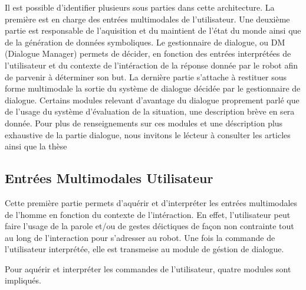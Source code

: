 \documentclass[a4paper,11pt,twoside]{StyleThese}
\begin{document}
Il est possible d'identifier plusieurs sous parties dans cette architecture.
La première est en charge des entrées multimodales de l'utilisateur. Une deuxième partie est responsable de l'aquisition et du maintient de l'état du monde ainsi que de la génération de données symboliques. Le gestionnaire de dialogue, ou DM (Dialogue Manager) permets de décider, en fonction des entrées interprétées de l'utilisateur et du contexte de l'intéraction de la réponse donnée par le robot afin de parvenir à déterminer son but.
La dernière partie s'attache à restituer sous forme multimodale la sortie du système de dialogue décidée par le gestionnaire de dialogue.
Certains modules relevant d'avantage du dialogue proprement parlé que de l'usage du système d'évaluation de la situation, une description brève en sera donnée. Pour plus de renseignements sur ces modules et une déscription plus exhaustive de la partie dialogue, nous invitons le lécteur à consulter les articles \cite{} ainsi que la thèse 



\subsection{Entrées Multimodales Utilisateur} 
Cette première partie permets d'aquérir et d'interpréter les entrées multimodales de l'homme en fonction du contexte de l'intéraction. En effet, l’utilisateur peut faire l’usage de la parole et/ou de
gestes déictiques de façon non contrainte tout au long de l’interaction pour s’adresser
au robot. Une fois la commande de l'utilisateur interprétée, elle est transmeise au module de géstion de dialogue. 

Pour aquérir et interpréter les commandes de l'utilisateur, quatre modules sont impliqués.
\end{document}
